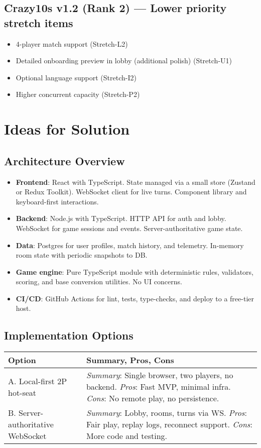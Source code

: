 \documentclass[12pt]{article}
\begin{document}
\subsection{Crazy10s v1.2 (Rank 2) --- Lower priority stretch items}
\begin{itemize}
  \item 4-player match support (Stretch-L2)
  \item Detailed onboarding preview in lobby (additional polish) (Stretch-U1)
  \item Optional language support (Stretch-I2)
  \item Higher concurrent capacity (Stretch-P2)
\end{itemize}

\section{Ideas for Solution}
\subsection{Architecture Overview}
\begin{itemize}
  \item \textbf{Frontend}: React with TypeScript. State managed via a small store (Zustand or Redux Toolkit). WebSocket client for live turns. Component library and keyboard-first interactions.
  \item \textbf{Backend}: Node.js with TypeScript. HTTP API for auth and lobby. WebSocket for game sessions and events. Server-authoritative game state.
  \item \textbf{Data}: Postgres for user profiles, match history, and telemetry. In-memory room state with periodic snapshots to DB.
  \item \textbf{Game engine}: Pure TypeScript module with deterministic rules, validators, scoring, and base conversion utilities. No UI concerns.
  \item \textbf{CI/CD}: GitHub Actions for lint, tests, type-checks, and deploy to a free-tier host.
\end{itemize}

\subsection{Implementation Options}
\begin{tabularx}{\textwidth}{lX}
  \toprule
  \textbf{Option} & \textbf{Summary, Pros, Cons} \\
  \midrule
  A. Local-first 2P hot-seat & \textit{Summary}: Single browser, two players, no backend. \textit{Pros}: Fast MVP, minimal infra. \textit{Cons}: No remote play, no persistence. \\
  \midrule
  B. Server-authoritative WebSocket & \textit{Summary}: Lobby, rooms, turns via WS. \textit{Pros}: Fair play, replay logs, reconnect support. \textit{Cons}: More code and testing. \\
  \midrule
\end{tabularx}
\end{document}

